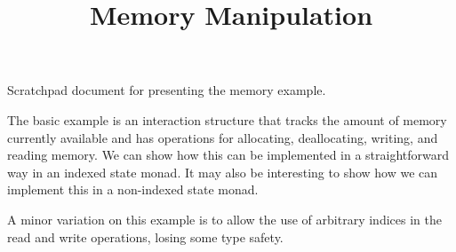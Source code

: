 \documentclass{article}
\title{\vspace{-2cm}Memory Manipulation}
\theoremstyle{definition}
\begin{document}
    \maketitle

    Scratchpad document for presenting the memory example.

    The basic example is an interaction structure that tracks the amount of memory currently available and has
    operations for allocating, deallocating, writing, and reading memory.  We can show how this can be implemented in a
    straightforward way in an indexed state monad.  It may also be interesting to show how we can implement this in a
    non-indexed state monad.

    A minor variation on this example is to allow the use of arbitrary indices in the read and write operations, losing
    some type safety.
\end{document}
